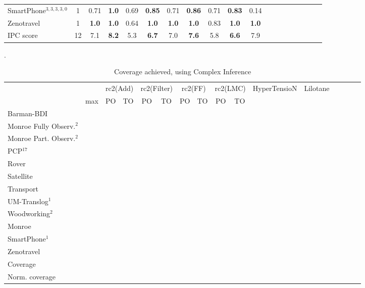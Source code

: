 \documentclass[letterpaper]{article} %
\begin{document}
\begin{table}
{\begin{tabular}{lccccccccccccccccccl}
			SmartPhone$^{3,3,3,3,0}$ & 1 & 0.71 & \textbf{1.0} & 0.69 & \textbf{0.85} & 0.71 & \textbf{0.86} & 0.71 & \textbf{0.83} &\multicolumn{2}{c}{ 0.14  } \\  
			Zenotravel & 1 & \textbf{1.0} & \textbf{1.0} & 0.64 & \textbf{1.0} & \textbf{1.0} & \textbf{1.0} & 0.83 & \textbf{1.0} &\multicolumn{2}{c}{ \textbf{1.0}  } \\ 
			\midrule 
			IPC score & 12 & 7.1 & \textbf{8.2} & 5.3 & \textbf{6.7} & 7.0 & \textbf{7.6} & 5.8 & \textbf{6.6} &\multicolumn{2}{c}{ 7.9  } \\ 
			\bottomrule 
		\end{tabular} 
	}
\end{table} 



\begin{table}
	\centering
	\caption{Coverage achieved, using Complex Inference}
	\label{table:GroundedComplexCoverage}.
	\scalebox{0.8} {
		\begin{tabular}{lccccccccccccccccl} 
			\toprule 
			&& \multicolumn{2}{c}{rc2(Add)} & \multicolumn{2}{c}{rc2(Filter)} & \multicolumn{2}{c}{rc2(FF)} & \multicolumn{2}{c}{rc2(LMC)} & \multicolumn{2}{c}{HyperTensioN} & \multicolumn{2}{c}{Lilotane} \\ 
			\cmidrule(lr){3-4} \cmidrule(lr){5-6} \cmidrule(lr){7-8} \cmidrule(lr){9-10}     \cmidrule(lr){11-12} \cmidrule(lr){13-14}  
			& max &PO & TO & PO & TO & PO & TO & PO & TO \\ 
			\midrule 
			Barman-BDI  \\ 
			Monroe Fully Observ.$^{2}$   \\ 
			Monroe Part. Observ.$^{2}$  \\ 
			PCP$^{17}$  \\ 
			Rover  \\ 
			Satellite   \\  
			Transport   \\ 
			UM-Translog$^{1}$  \\ 
			Woodworking$^{2}$  \\ 
			\midrule 
			Monroe   \\ 
			SmartPhone$^{1}$   \\ 
			Zenotravel   \\ 
			\midrule 
			Coverage  \\ 
			Norm. coverage  \\ 
			\bottomrule 
		\end{tabular}  
	}
\end{table}
\end{document}
